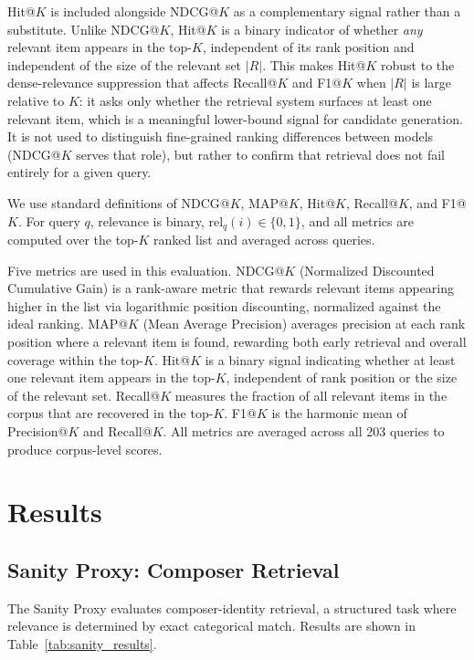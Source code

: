 \documentclass{CPP}
\begin{document}
Hit@$K$ is included alongside NDCG@$K$ as a complementary signal rather than a substitute. Unlike NDCG@$K$, Hit@$K$ is a binary indicator of whether \emph{any} relevant item appears in the top-$K$, independent of its rank position and independent of the size of the relevant set $|R|$. This makes Hit@$K$ robust to the dense-relevance suppression that affects Recall@$K$ and F1@$K$ when $|R|$ is large relative to $K$: it asks only whether the retrieval system surfaces at least one relevant item, which is a meaningful lower-bound signal for candidate generation. It is not used to distinguish fine-grained ranking differences between models (NDCG@$K$ serves that role), but rather to confirm that retrieval does not fail entirely for a given query.

We use standard definitions of NDCG@$K$, MAP@$K$, Hit@$K$, Recall@$K$, and F1@$K$. For query $q$, relevance is binary, $\mathrm{rel}_q(i) \in \{0,1\}$, and all metrics are computed over the top-$K$ ranked list and averaged across queries.

Five metrics are used in this evaluation. NDCG@$K$ (Normalized Discounted Cumulative Gain) is a rank-aware metric that rewards relevant items appearing higher in the list via logarithmic position discounting, normalized against the ideal ranking. MAP@$K$ (Mean Average Precision) averages precision at each rank position where a relevant item is found, rewarding both early retrieval and overall coverage within the top-$K$. Hit@$K$ is a binary signal indicating whether at least one relevant item appears in the top-$K$, independent of rank position or the size of the relevant set. Recall@$K$ measures the fraction of all relevant items in the corpus that are recovered in the top-$K$. F1@$K$ is the harmonic mean of Precision@$K$ and Recall@$K$. All metrics are averaged across all 203 queries to produce corpus-level scores.

\chapter{Results}\label{sec:results}

\section{Sanity Proxy: Composer Retrieval}

The Sanity Proxy evaluates composer-identity retrieval, a structured task where relevance is determined by exact categorical match. Results are shown in Table~\ref{tab:sanity_results}.
\end{document}
